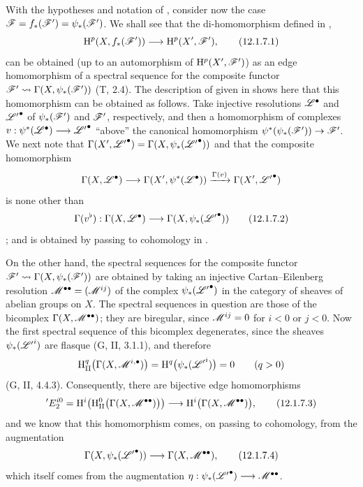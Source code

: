 \begin{env}[12.1.7]
\label{0.12.1.7}
With the hypotheses and notation of , consider now the
case $\mathscr{F}=f_*(\mathscr{F}')=\psi_*(\mathscr{F}')$.
We shall see that the di-homomorphism defined in ,
\[
  \mathrm{H}^p(X,f_*(\mathscr{F}'))\longrightarrow\mathrm{H}^p(X',\mathscr{F}'),
  \tag{12.1.7.1}
  \label{0.12.1.7.1}
\]
can be obtained (up to an automorphism of $\mathrm{H}^p(X',\mathscr{F}')$) as an
edge homomorphism of a spectral sequence for the composite functor $\mathscr{F}'\leadsto\Gamma(X,\psi_*(\mathscr{F}'))$
(T, 2.4).
The description of  given in  shows
here that this homomorphism can be obtained as follows.
Take injective resolutions $\mathscr{L}^\bullet$ and
${\mathscr{L}'}^\bullet$ of $\psi_*(\mathscr{F}')$ and $\mathscr{F}'$,
respectively, and then a homomorphism of complexes $v:\psi^*(\mathscr{L}^\bullet)\longrightarrow{\mathscr{L}'}^\bullet$
``above'' the canonical homomorphism
$\psi^*(\psi_*(\mathscr{F}'))\to\mathscr{F}'$.
We next note that $\Gamma(X',{\mathscr{L}'}^\bullet)
=\Gamma(X,\psi_*({\mathscr{L}'}^\bullet))$
and that the composite homomorphism
\[
  \Gamma(X,\mathscr{L}^\bullet)
  \longrightarrow\Gamma(X',\psi^*(\mathscr{L}^\bullet))
  \xrightarrow{\Gamma(v)}\Gamma(X',{\mathscr{L}'}^\bullet)
\]
is none other than
\[
  \Gamma(v^\flat):
  \Gamma(X,\mathscr{L}^\bullet)
  \longrightarrow\Gamma(X,\psi_*({\mathscr{L}'}^\bullet))
  \tag{12.1.7.2}
  \label{0.12.1.7.2}
\]
; and  is
obtained by passing to cohomology in .

On the other hand, the spectral sequences for the composite functor $\mathscr{F}'\leadsto\Gamma(X,\psi_*(\mathscr{F}'))$
are obtained by taking an injective Cartan--Eilenberg resolution $\mathscr{M}^{\bullet\bullet}=(\mathscr{M}^{ij})$
of the complex $\psi_*({\mathscr{L}'}^\bullet)$ in the category of
sheaves of abelian groups on $X$.
The spectral sequences in question are those of the bicomplex
$\Gamma(X,\mathscr{M}^{\bullet\bullet})$; they are biregular, since
$\mathscr{M}^{ij}=0$ for $i<0$ or $j<0$.
Now the first spectral sequence of this bicomplex degenerates, since
the sheaves $\psi_*({\mathscr{L}'}^i)$ are flasque (G, II, 3.1.1), and
therefore
\[
  \mathrm{H}_\mathrm{II}^q
    \bigl(\Gamma(X,\mathscr{M}^{i,\bullet})\bigr)
  =\mathrm{H}^q\bigl(\psi_*({\mathscr{L}'}^i)\bigr)=0
  \qquad(q>0)
\]
(G, II, 4.4.3).
Consequently, there are bijective edge homomorphisms
\[
  {}'E_2^{i0}
  =\mathrm{H}^i\!\left(
      \mathrm{H}_\mathrm{II}^0
        \bigl(\Gamma(X,\mathscr{M}^{\bullet\bullet})\bigr)
    \right)
  \longrightarrow
  \mathrm{H}^i\bigl(\Gamma(X,\mathscr{M}^{\bullet\bullet})\bigr),
  \tag{12.1.7.3}
  \label{0.12.1.7.3}
\]
and we know  that this homomorphism comes, on passing
to cohomology, from the augmentation
\[
  \Gamma(X,\psi_*({\mathscr{L}'}^\bullet))
  \longrightarrow\Gamma(X,\mathscr{M}^{\bullet\bullet}),
  \tag{12.1.7.4}
  \label{0.12.1.7.4}
\]
which itself comes from the augmentation $\eta:\psi_*({\mathscr{L}'}^\bullet)
\longrightarrow\mathscr{M}^{\bullet\bullet}$.


\end{env}
